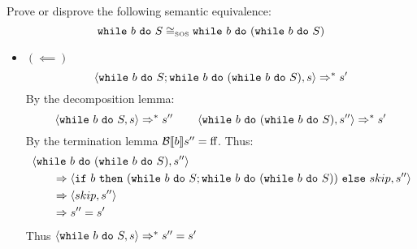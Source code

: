 \begin{exercise}{
    Prove or disprove the following semantic equivalence:
    \[ \texttt{while}\ b\ \texttt{do}\ S \cong_{\text{\tiny SOS}} \texttt{while}\ b\ \texttt{do}\ (\texttt{while}\ b\ \texttt{do}\ S)  \]
}
\begin{itemize}
\begin{itemize}
\begin{align*}
                        &\instr{\wwhile{b}{S}; \wwhile{b}{(\wwhile{b}{S})}}{s}
                        \\&\qquad\Rightarrow^* \instr{\wwhile{b}{(\wwhile{b}{S})}}{s'}
                        \\&\qquad\Rightarrow \instr{\wif{b}{(\wwhile{b}{S}; \wwhile{b}{(\wwhile{b}{S})})}{skip}}{s'}
                        \\&\qquad\Rightarrow \instr{skip}{s'}
                        \\&\qquad\Rightarrow s'
                    \end{align*}
                \item $(\impliedby)$
                    \[ \left<\texttt{while}\ b\ \texttt{do}\ S; \texttt{while}\ b\ \texttt{do}\ (\texttt{while}\ b\ \texttt{do}\ S), s\right> \Rightarrow^* s' \]
                    By the decomposition lemma:
                    \[
                        \left<\texttt{while}\ b\ \texttt{do}\ S, s\right> \Rightarrow^* s''
                        \qquad
                        \left<\texttt{while}\ b\ \texttt{do}\ (\texttt{while}\ b\ \texttt{do}\ S), s''\right> \Rightarrow^* s'
                    \]
                    By the termination lemma $\mathcal{B} \llbracket b \rrbracket s'' = \text{ff}$. Thus:
                    \begin{align*}
                        &\left<\texttt{while}\ b\ \texttt{do}\ (\texttt{while}\ b\ \texttt{do}\ S), s''\right>
                        \\&\qquad\Rightarrow \left<\texttt{if}\ b\ \texttt{then}\ (\texttt{while}\ b\ \texttt{do}\ S; \texttt{while}\ b\ \texttt{do}\ (\texttt{while}\ b\ \texttt{do}\ S))\ \texttt{else}\ skip, s''\right>
                        \\&\qquad\Rightarrow \left<skip, s''\right>
                        \\&\qquad\Rightarrow s'' = s'
                    \end{align*}
                    Thus $\left<\texttt{while}\ b\ \texttt{do}\ S, s\right> \Rightarrow^* s'' = s'$
            \end{itemize}
    \end{itemize}
\end{exercise}
